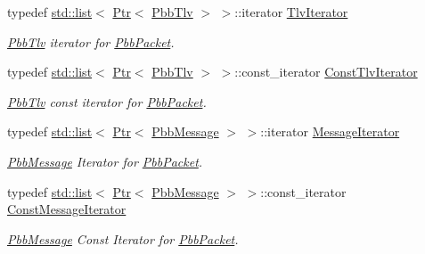 \begin{DoxyCompactItemize}
\item 
typedef \hyperlink{openflow-interface_8h_afd9bcfa176617760671b67580f536fa7}{std\+::list}$<$ \hyperlink{classns3_1_1Ptr}{Ptr}$<$ \hyperlink{classns3_1_1PbbTlv}{Pbb\+Tlv} $>$ $>$\+::iterator \hyperlink{classns3_1_1PbbPacket_aed5b643d3a1c201bd4071eed0e2066d5}{Tlv\+Iterator}
\begin{DoxyCompactList}\small\item\em \hyperlink{classns3_1_1PbbTlv}{Pbb\+Tlv} iterator for \hyperlink{classns3_1_1PbbPacket}{Pbb\+Packet}. \end{DoxyCompactList}\item 
typedef \hyperlink{openflow-interface_8h_afd9bcfa176617760671b67580f536fa7}{std\+::list}$<$ \hyperlink{classns3_1_1Ptr}{Ptr}$<$ \hyperlink{classns3_1_1PbbTlv}{Pbb\+Tlv} $>$ $>$\+::const\+\_\+iterator \hyperlink{classns3_1_1PbbPacket_af4ade92b0fd19f31c07ad2cd0303ed21}{Const\+Tlv\+Iterator}
\begin{DoxyCompactList}\small\item\em \hyperlink{classns3_1_1PbbTlv}{Pbb\+Tlv} const iterator for \hyperlink{classns3_1_1PbbPacket}{Pbb\+Packet}. \end{DoxyCompactList}\item 
typedef \hyperlink{openflow-interface_8h_afd9bcfa176617760671b67580f536fa7}{std\+::list}$<$ \hyperlink{classns3_1_1Ptr}{Ptr}$<$ \hyperlink{classns3_1_1PbbMessage}{Pbb\+Message} $>$ $>$\+::iterator \hyperlink{classns3_1_1PbbPacket_a5fed659b1aebf8573c8f3aebe41e6013}{Message\+Iterator}
\begin{DoxyCompactList}\small\item\em \hyperlink{classns3_1_1PbbMessage}{Pbb\+Message} Iterator for \hyperlink{classns3_1_1PbbPacket}{Pbb\+Packet}. \end{DoxyCompactList}\item 
typedef \hyperlink{openflow-interface_8h_afd9bcfa176617760671b67580f536fa7}{std\+::list}$<$ \hyperlink{classns3_1_1Ptr}{Ptr}$<$ \hyperlink{classns3_1_1PbbMessage}{Pbb\+Message} $>$ $>$\+::const\+\_\+iterator \hyperlink{classns3_1_1PbbPacket_a59b58a11ce8de2cc2ff3c7fd7c4f1d10}{Const\+Message\+Iterator}
\begin{DoxyCompactList}\small\item\em \hyperlink{classns3_1_1PbbMessage}{Pbb\+Message} Const Iterator for \hyperlink{classns3_1_1PbbPacket}{Pbb\+Packet}. \end{DoxyCompactList}\end{DoxyCompactItemize}

